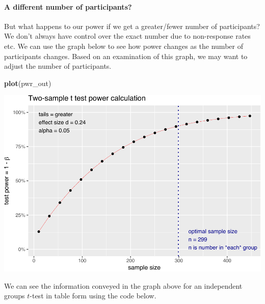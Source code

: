 \documentclass[
]{krantz}
\makeatletter
\newenvironment{Shaded}{\begin{snugshade}}{\end{snugshade}}
\newcommand{\KeywordTok}[1]{\textcolor[rgb]{0.27,0.27,0.27}{\textbf{#1}}}
\newcommand{\NormalTok}[1]{#1}
\newenvironment{kframe}{%
\medskip{}
\setlength{\fboxsep}{.8em}
 \def\at@end@of@kframe{}%
 \ifinner\ifhmode%
  \def\at@end@of@kframe{\end{minipage}}%
  \begin{minipage}{\columnwidth}%
 \fi\fi%
 \def\FrameCommand##1{\hskip\@totalleftmargin \hskip-\fboxsep
 \colorbox{shadecolor}{##1}\hskip-\fboxsep
     \hskip-\linewidth \hskip-\@totalleftmargin \hskip\columnwidth}%
 \MakeFramed {\advance\hsize-\width
   \@totalleftmargin\z@ \linewidth\hsize
   \@setminipage}}%
 {\par\unskip\endMakeFramed%
 \at@end@of@kframe}
\renewenvironment{Shaded}{\begin{kframe}}{\end{kframe}}
\makeatother
\begin{document}
\hypertarget{a-different-number-of-participants}{%
\paragraph{A different number of participants?}\label{a-different-number-of-participants}}

But what happens to our power if we get a greater/fewer number of participants? We don't always have control over the exact number due to non-response rates etc. We can use the graph below to see how power changes as the number of participants changes. Based on an examination of this graph, we may want to adjust the number of participants.

\begin{Shaded}
\begin{Highlighting}[]
\KeywordTok{plot}\NormalTok{(pwr_out)}
\end{Highlighting}
\end{Shaded}

\includegraphics{bookdown_files/figure-latex/unnamed-chunk-238-1.pdf}

We can see the information conveyed in the graph above for an independent groups \(t\)-test in table form using the code below.
\end{document}
